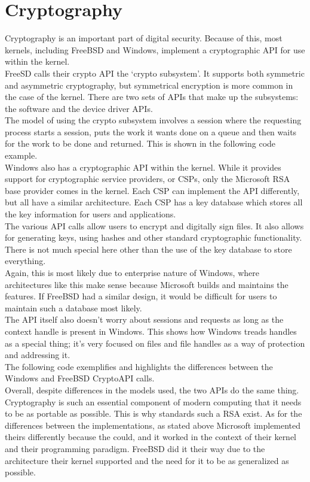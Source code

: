 \documentclass[titlepage]{article}
\begin{document}
\section{Cryptography}
\begin{singlespace}
    Cryptography is an important part of digital security. Because of this, most kernels, including FreeBSD and Windows, implement a cryptographic API for use within the kernel.\\
    FreeSD calls their crypto API the ‘crypto subsystem’. It supports both symmetric and asymmetric cryptography, but symmetrical encryption is more common in the case of the kernel. There are two sets of APIs that make up the subsystems: the software and the device driver APIs. \cite{freebsdch5}\\
    The model of using the crypto subsystem involves a session where the requesting process starts a session, puts the work it wants done on a queue and then waits for the work to be done and returned. This is shown in the following code example. \\

    Windows also has a cryptographic API within the kernel. While it provides support for cryptographic service providers, or CSPs, only the Microsoft RSA base provider comes in the kernel. Each CSP can implement the API differently, but all have a similar architecture. Each CSP has a key database which stores all the key information for users and applications. \\
    The various API calls allow users to encrypt and digitally sign files. It also allows for generating keys, using hashes and other standard cryptographic functionality. There is not much special here other than the use of the key database to store everything.\cite{msdn}\\
    Again, this is most likely due to enterprise nature of Windows, where architectures like this make sense because Microsoft builds and maintains the features. If FreeBSD had a similar design, it would be difficult for users to maintain such a database most likely. \\
    The API itself also doesn’t worry about sessions and requests as long as the context handle is present in Windows. This shows how Windows treads handles as a special thing; it’s very focused on files and file handles as a way of protection and addressing it.\\
    The following code exemplifies and highlights the differences between the Windows and FreeBSD CryptoAPI calls.\\ 

    Overall, despite differences in the models used, the two APIs do the same thing. Cryptography is such an essential component of modern computing that it needs to be as portable as possible. This is why standards such a RSA exist. As for the differences between the implementations, as stated above Microsoft implemented theirs differently because the could, and it worked in the context of their kernel and their programming paradigm. FreeBSD did it their way due to the architecture their kernel supported and the need for it to be as generalized as possible. \\
\end{singlespace}

\newpage


\end{document}
